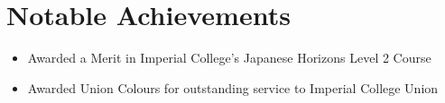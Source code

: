 \documentclass[11pt,a4paper,sans]{moderncv}        %
\begin{document}
\section{Notable Achievements}

\begin{itemize}

\item Awarded a Merit in Imperial College's Japanese Horizons Level 2 Course

\item Awarded Union Colours for outstanding service to Imperial College Union

\end{itemize}

\nocite{*}



\end{document}
